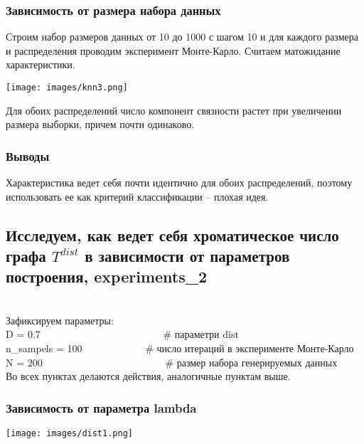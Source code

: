 \documentclass[a4paper,12pt]{article}
\begin{document}
\subsubsection*{Зависимость от размера набора данных}

Строим набор размеров данных от 10 до 1000 с шагом 10 и для каждого размера и распределения проводим эксперимент Монте-Карло. Считаем матожидание характеристики.

\begin{center}
\texttt{[image: images/knn3.png]} \end{center}

Для обоих распределений число компонент связности растет при увеличении размера выборки, причем почти одинаково.

\subsubsection*{Выводы}
Характеристика ведет себя почти идентично для обоих распределений, поэтому использовать ее как критерий классификации -- плохая идея.

\newpage

\subsection{Исследуем, как ведет себя хроматическое число графа $T^{dist}$ в зависимости от параметров построения, experiments\_2}
\\

Зафиксируем параметры:\\
D = 0.7   \ \ \ \     \ \ \  \ \ \ \ \  \ \ \ \ \  \ \ \ \ \ \ \   # параметри dist\\
n\_sampels = 100  \ \ \ \ \ \ \ \ \ \ \ \   # число итераций в эксперименте Монте-Карло\\
N = 200  \ \ \ \ \ \ \ \ \ \  \ \ \ \ \ \ \ \ \ \ \ \ \ \          # размер набора генерируемых данных\\


Во всех пунктах делаются действия, аналогичные пунктам выше.

\subsubsection*{Зависимость от параметра lambda}

\begin{center}
\texttt{[image: images/dist1.png]} \end{center}
\end{document}
